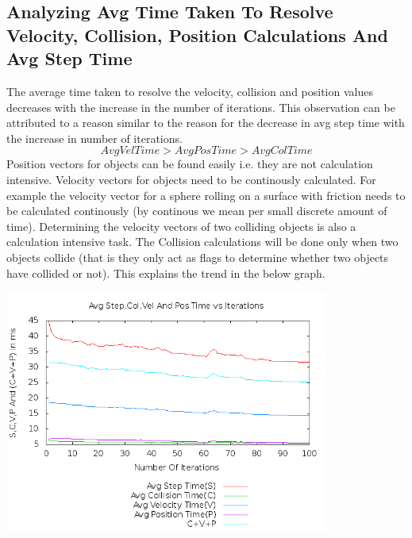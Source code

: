 \documentclass[11pt]{article}
\begin{document}
	\subsection{Analyzing Avg Time Taken To Resolve Velocity, Collision, Position Calculations And Avg Step Time}	
	The average time taken to resolve the velocity, collision and position values decreases with the increase in the number of iterations. This observation can be attributed to a reason similar to the reason for the decrease in avg step time with the increase in number of iterations. \newline
	\begin{equation*} AvgVelTime > AvgPosTime > AvgColTime \end{equation*} \newline
	Position vectors for objects can be found easily i.e. they are not calculation intensive. Velocity vectors for objects need to be continously calculated. For example the velocity vector for a sphere rolling on a surface with friction needs to be calculated continously (by continous we mean per small discrete amount of time). Determining the velocity vectors of two colliding objects is also a calculation intensive task. The Collision calculations will be done only when two objects collide (that is they only act as flags to determine whether two objects have collided or not). This explains the trend in the below graph.  
	
	\begin{center}\includegraphics[height=8cm]{100_30_plot02.png}\end{center}
\end{document}
